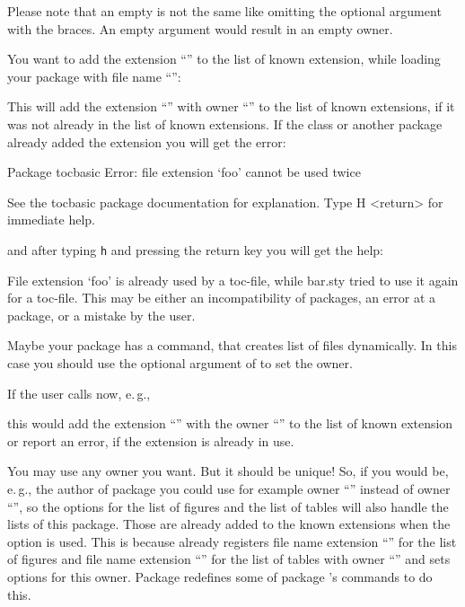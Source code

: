 Please note that an empty  is not the same
like omitting the optional argument with the braces. An empty argument would
result in an empty owner.
\begin{Example}
  You want to add the extension ``'' to the list of known extension,
  while loading your package with file name ``'':
\begin{lstcode}
\end{lstcode}%
  This will add the extension ``'' with owner ``''
  to the list of known extensions, if it was not already in the list of known
  extensions. If the class or another package already added the extension you
  will get the error:
\begin{lstoutput}
  Package tocbasic Error: file extension `foo' cannot be used twice

  See the tocbasic package documentation for explanation.
  Type  H <return>  for immediate help.
\end{lstoutput}
  and after typing \texttt{h} and pressing the return key you will get the
  help:
\begin{lstoutput}
  File extension `foo' is already used by a toc-file, while bar.sty
  tried to use it again for a toc-file.
  This may be either an incompatibility of packages, an error at a package,
  or a mistake by the user.
\end{lstoutput}

  Maybe your package has a command, that creates list of files dynamically. In 
  this case you should use the optional argument of  to
  set the owner.
\begin{lstcode}
  \newcommand*{\createnewlistofsomething}[1]{%
    \addtotoclist[bar.sty]{#1}%
  }
\end{lstcode}
  If the user calls now, e.\,g.,
\begin{lstcode}
\end{lstcode}
  this would add the extension ``'' with the owner
  ``'' to the list of known extension or report an error, if
  the extension is already in use.
\end{Example}
You may use any owner you want.  But it should be unique!  So, if you would
be, e.\,g., the author of package  you could use for example
owner ``'' instead of owner ``'', so the
\KOMAScript{} options for the list of figures and the list of tables will also
handle the lists of this package. Those are already added to the known
extensions when the option is used. This is because \KOMAScript{} already
registers file name extension ``'' for the list of figures and
file name extension ``'' for the list of tables with owner
``'' and sets options for this owner. Package 
redefines some of package 's commands to do this.%
\EndIndexGroup


